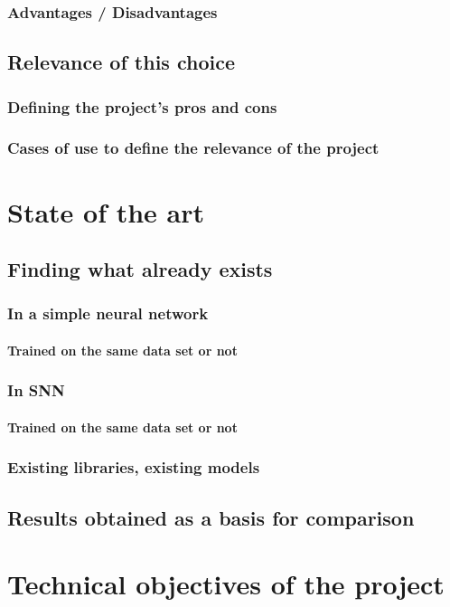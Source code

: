 \documentclass[11pt]{article}
\begin{document}
\subsubsection{Advantages / Disadvantages}
\subsection{Relevance of this choice}
\subsubsection{Defining the project's pros and cons}
\subsubsection{Cases of use to define the relevance of the project}

\section{State of the art}
\subsection{Finding what already exists}
\subsubsection{In a simple neural network}
\paragraph{Trained on the same data set or not}
\subsubsection{In SNN}
\paragraph{Trained on the same data set or not}
\subsubsection{Existing libraries, existing models}
\subsection{Results obtained as a basis for comparison}

\section{Technical objectives of the project}
\end{document}
